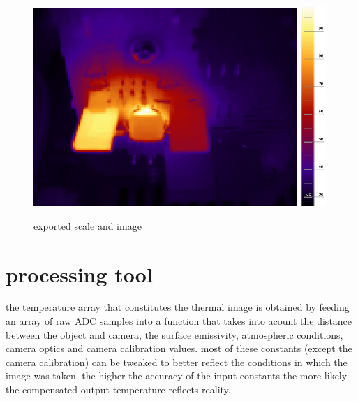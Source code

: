 \documentclass[12pt,twoside,a4paper,notitlepage]{report}
\begin{document}
\begin{figure}[ht]
 \centering
 \includegraphics[width=10cm, keepaspectratio=true]{img/tools_scale_exported}
 \includegraphics[width=9.5mm, keepaspectratio=true]{img/tools_scale_exported_scale}
 \caption{exported scale and image}
 \label{fig:tools-scale-exported}
\end{figure}

\newpage

\section{processing tool} \label{sec:tools-processing}

the temperature array that constitutes the thermal image is obtained by feeding an array of raw ADC samples into a function that takes into acount the distance between the object and camera, the surface emissivity, atmospheric conditions, camera optics and camera calibration values. most of these constants (except the camera calibration) can be tweaked to better reflect the conditions in which the image was taken. the higher the accuracy of the input constants the more likely the compensated output temperature reflects reality.
\end{document}
